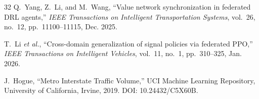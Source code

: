 \documentclass[journal]{IEEEtran}
\begin{document}
\begin{thebibliography}{32}
Q.~Yang, Z.~Li, and M.~Wang, ``Value network synchronization in federated DRL agents,'' \emph{IEEE Transactions on Intelligent Transportation Systems}, vol.~26, no.~12, pp.~11100--11115, Dec. 2025.

T.~Li \textit{et al.}, ``Cross-domain generalization of signal policies via federated PPO,'' \emph{IEEE Transactions on Intelligent Vehicles}, vol.~11, no.~1, pp.~310--325, Jan. 2026.

J.~Hogue, ``Metro Interstate Traffic Volume,'' UCI Machine Learning Repository, University of California, Irvine, 2019. DOI: 10.24432/C5X60B.

\end{thebibliography}
\end{document}
